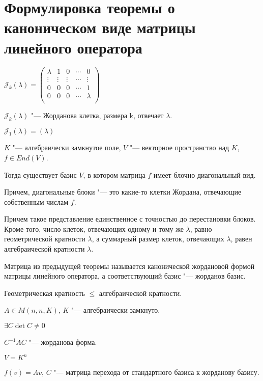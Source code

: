 \section{Формулировка теоремы о каноническом виде матрицы линейного оператора}
\begin{Def}
$\mathcal{J}_k(\lambda) = \begin{pmatrix}
\lambda&1&0&\cdots&0\\
\vdots&\vdots&\vdots&\cdots&\vdots\\
0&0&0&\cdots&1\\
0&0&0&\cdots&\lambda\\
\end{pmatrix}$

$\mathcal{J}_k(\lambda)$ "--- Жорданова клетка, размера k, отвечает $\lambda$.

$\mathcal{J}_1(\lambda) = (\lambda)$
\end{Def}

\begin{theorem}{}
$K$ "--- алгебраически замкнутое поле, $V$ "--- векторное пространство над $K$, 
$f \in End(V)$.

Тогда существует базис $V$, в котором матрица $f$ имеет блочно диагональный вид.

Причем, диагональные блоки "--- это какие-то клетки Жордана, отвечающие собственным 
числам $f$.

Причем такое представление единственное с точностью до перестановки блоков.
Кроме того, число клеток, отвечающих одному и тому же $\lambda$, равно геометрической
кратности $\lambda$, а суммарный размер клеток, отвечающих $\lambda$, равен
алгебраической кратности $\lambda$. 
\end{theorem}

\begin{Def}
Матрица из предыдущей теоремы называется канонической жордановой формой
матрицы линейного оператора, а соответствующий базис "--- жорданов базис.
\end{Def}
\begin{conseq}
Геометрическая кратность $\le$ алгебраической кратности.
\end{conseq}

\begin{conseq}
$A \in M(n, n, K)$, $K$ "--- алгебраически замкнуто.

$\exists C \det C \ne 0$

$C^{-1}AC$ "--- жорданова форма.

$V = K^{n}$

$f(v) = Av$, $C$ "--- матрица перехода от стандартного базиса к жорданову базису.
\end{conseq}

